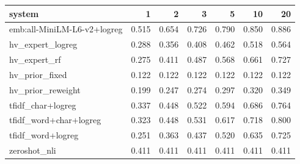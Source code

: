 \begin{tabular}{lrrrrrr}
\toprule
system & 1 & 2 & 3 & 5 & 10 & 20 \\
\midrule
emb:all-MiniLM-L6-v2+logreg & 0.515 & 0.654 & 0.726 & 0.790 & 0.850 & 0.886 \\
hv\_expert\_logreg & 0.288 & 0.356 & 0.408 & 0.462 & 0.518 & 0.564 \\
hv\_expert\_rf & 0.275 & 0.411 & 0.487 & 0.568 & 0.661 & 0.727 \\
hv\_prior\_fixed & 0.122 & 0.122 & 0.122 & 0.122 & 0.122 & 0.122 \\
hv\_prior\_reweight & 0.199 & 0.247 & 0.274 & 0.297 & 0.320 & 0.349 \\
tfidf\_char+logreg & 0.337 & 0.448 & 0.522 & 0.594 & 0.686 & 0.764 \\
tfidf\_word+char+logreg & 0.323 & 0.448 & 0.531 & 0.617 & 0.718 & 0.800 \\
tfidf\_word+logreg & 0.251 & 0.363 & 0.437 & 0.520 & 0.635 & 0.725 \\
zeroshot\_nli & 0.411 & 0.411 & 0.411 & 0.411 & 0.411 & 0.411 \\
\bottomrule
\end{tabular}
